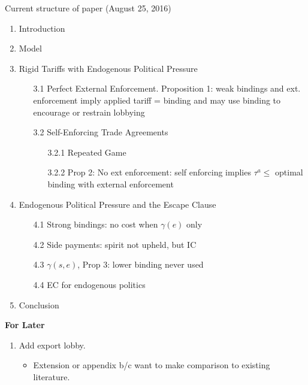 \documentclass[12pt]{article}
\newcommand{\ga}{\gamma}
\begin{document}
\newpage
Current structure of paper (August 25, 2016)
\begin{enumerate}
	\item Introduction
	\item Model
	\item Rigid Tariffs with Endogenous Political Pressure
		\begin{itemize}
			\item[3.1] Perfect External Enforcement. Proposition 1: weak bindings and ext. enforcement imply applied tariff = binding and may use binding to encourage or restrain lobbying
			\item[3.2] Self-Enforcing Trade Agreements
				\begin{itemize}
					\item[3.2.1] Repeated Game
					\item[3.2.2] Prop 2: No ext enforcement: self enforcing implies $\tau^a \leq$ optimal binding with external enforcement
				\end{itemize}
		\end{itemize}
	\item Endogenous Political Pressure and the Escape Clause
		\begin{itemize}
			\item[4.1] Strong bindings: no cost when $\ga(e)$ only
			\item[4.2] Side payments: spirit not upheld, but IC
			\item[4.3] $\ga(s,e)$, Prop 3: lower binding never used
			\item[4.4] EC for endogenous politics
		\end{itemize}
	\item Conclusion
\end{enumerate}


\newpage
\begin{center}
\textbf{\large{For Later}}
\end{center}
\begin{enumerate}
	\item Add export lobby. 
		\begin{itemize}
			\item Extension or appendix b/c want to make comparison to existing literature.
		\end{itemize}
\end{enumerate}
\end{document}

